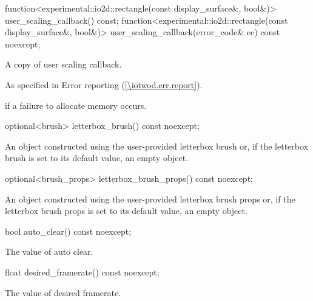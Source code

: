 %
\begin{itemdecl}
function<experimental::io2d::rectangle(const display_surface&, bool&)>
  user_scaling_callback() const;
function<experimental::io2d::rectangle(const display_surface&, bool&)>
  user_scaling_callback(error_code& ec) const noexcept;
\end{itemdecl}
\begin{itemdescr}
\pnum
\returns
A copy of user scaling callback.

\pnum
\throws
As specified in Error reporting (\ref{\iotwod.err.report}).

\pnum
\errors
{} if a failure to allocate memory occurs.
\end{itemdescr}

%
\begin{itemdecl}
optional<brush> letterbox_brush() const noexcept;
\end{itemdecl}
\begin{itemdescr}
\pnum
\returns
An  object constructed using the user-provided letterbox brush or, if the letterbox brush is set to its default value, an empty  object.
\end{itemdescr}

%
\begin{itemdecl}
optional<brush_props> letterbox_brush_props() const noexcept;
\end{itemdecl}
\begin{itemdescr}
\pnum
\returns
An  object constructed using the user-provided letterbox brush props or, if the letterbox brush props is set to its default value, an empty  object.
\end{itemdescr}

%
\begin{itemdecl}
bool auto_clear() const noexcept;
\end{itemdecl}
\begin{itemdescr}
\pnum
\returns
The value of auto clear.
\end{itemdescr}

%
\begin{itemdecl}
float desired_framerate() const noexcept;
\end{itemdecl}
\begin{itemdescr}
\pnum
\returns
The value of desired framerate.
\end{itemdescr}

